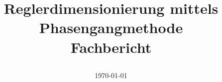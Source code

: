 \title{%
    \vspace{40mm}
    \Huge{Reglerdimensionierung mittels Phasengangmethode} \\
    \vspace{20mm}
    \huge{Fachbericht}
    \date{\today}
}
